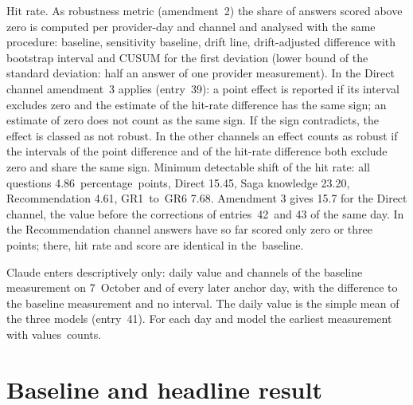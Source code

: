 \documentclass[11pt]{article}
\begin{document}
Hit rate. As robustness metric (amendment~2) the share of answers scored above zero is computed per provider-day and channel and analysed with the same procedure: baseline, sensitivity baseline, drift line, drift-adjusted difference with bootstrap interval and CUSUM for the first deviation (lower bound of the standard deviation: half an answer of one provider measurement). In the Direct channel amendment~3 applies (entry~39): a point effect is reported if its interval excludes zero and the estimate of the hit-rate difference has the same sign; an estimate of zero does not count as the same sign. If the sign contradicts, the effect is classed as not robust. In the other channels an effect counts as robust if the intervals of the point difference and of the hit-rate difference both exclude zero and share the same sign. Minimum detectable shift of the hit rate: all questions 4.86~percentage~points, Direct 15.45, Saga knowledge 23.20, Recommendation 4.61, GR1~to~GR6 7.68. Amendment 3 gives 15.7 for the Direct channel, the value before the corrections of entries~42~and 43 of the same day. In the Recommendation channel answers have so far scored only zero or three points; there, hit rate and score are identical in the~\mbox{baseline.}

Claude enters descriptively only: daily value and channels of the baseline measurement on 7~October and of every later anchor day, with the difference to the baseline measurement and no interval. The daily value is the simple mean of the three models (entry~41). For each day and model the earliest measurement with values~\mbox{counts.}

\section{Baseline and headline result}
\end{document}
